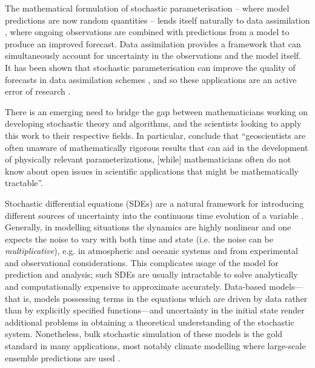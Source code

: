 The mathematical formulation of stochastic parameterisation -- where model predictions are now random quantities -- lends itself naturally to data assimilation \citep{BudhirajaEtAl_2019_AssimilatingDataModels,Jazwinski_2014_StochasticProcessesFiltering,LawEtAl_2015_DataAssimilationMathematical,ReichCotter_2015_ProbabilisticForecastingBayesian}, where ongoing observations are combined with predictions from a model to produce an improved forecast.
Data assimilation provides a framework that can simultaneously account for uncertainty in the observations and the model itself.
It has been shown that stochastic parameterisation can improve the quality of forecasts in data assimilation schemes \citep{MitchellGottwald_2012_DataAssimilationSlow,HaEtAl_2015_ComparisonModelError}, and so these applications are an active error of research \citep[e.g.]{GottwaldHarlim_2013_RoleAdditiveMultiplicative}.

There is an emerging need to bridge the gap between mathematicians working on developing stochastic theory and algorithms, and the scientists looking to apply this work to their respective fields.
In particular, \citet{BernerEtAl_2017_StochasticParameterizationNew} conclude that ``geoscientists are often unaware of mathematically rigorous results that can aid in the development of physically relevant parameterizations, [while] mathematicians often do not know about open issues in scientific applications that might be mathematically tractable''.

Stochastic differential equations (SDEs) are a natural framework for introducing different sources of uncertainty into the continuous time evolution of a variable \citep{Oksendal_2003_StochasticDifferentialEquations,SarkkaSolin_2019_AppliedStochasticDifferential,KallianpurSundar_2014_StochasticAnalysisDiffusion}.
Generally, in modelling situations the dynamics are highly nonlinear and one expects the noise to vary with both time and state (i.e. the noise can be \emph{multiplicative}), e.g. in atmospheric \citep{SuraEtAl_2005_MultiplicativeNoiseNonGaussianity,Sura_2003_StochasticAnalysisSouthern} and oceanic \citep{KamenkovichEtAl_2015_PropertiesOriginsAnisotropic} systems and from experimental and observational considerations.
This complicates usage of the model for prediction and analysis; such SDEs are usually intractable to solve analytically and computationally expensive to approximate accurately.
Data-based models---that is, models possessing terms in the equations which are driven by data rather than by explicitly specified functions---and uncertainty in the initial state render additional problems in obtaining a theoretical understanding of the stochastic system.
Nonetheless, bulk stochastic simulation of these models is the gold standard in many applications, most notably climate modelling where large-scale ensemble predictions are used \citep{Collins_2007_EnsemblesProbabilitiesNew,LeutbecherEtAl_2017_StochasticRepresentationsModel}.

